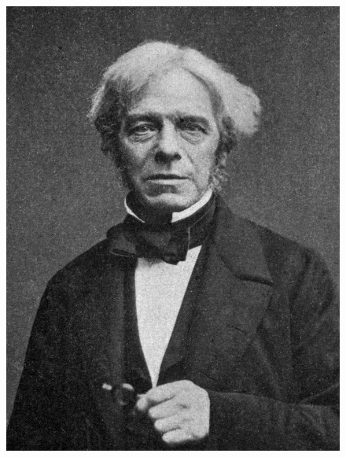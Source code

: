 \documentclass[crop=false]{standalone}
\begin{document}
\begin{figure}[H]
    \includegraphics[width=\linewidth]{images/michael-faraday.jpeg}
  \endminipage\hfill

\end{figure}
\end{document}
